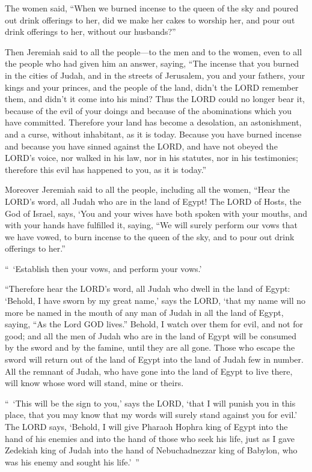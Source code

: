 \myverse{}The women said, “When we burned incense to the queen of the sky and poured out drink offerings to her, did we make her cakes to worship her, and pour out drink offerings to her, without our husbands?”


\myverse{}Then Jeremiah said to all the people—to the men and to the women, even to all the people who had given him an answer, saying, \myverse{}“The incense that you burned in the cities of Judah, and in the streets of Jerusalem, you and your fathers, your kings and your princes, and the people of the land, didn’t the LORD remember them, and didn’t it come into his mind? \myverse{}Thus the LORD could no longer bear it, because of the evil of your doings and because of the abominations which you have committed. Therefore your land has become a desolation, an astonishment, and a curse, without inhabitant, as it is today. \myverse{}Because you have burned incense and because you have sinned against the LORD, and have not obeyed the LORD’s voice, nor walked in his law, nor in his statutes, nor in his testimonies; therefore this evil has happened to you, as it is today.”


\myverse{}Moreover Jeremiah said to all the people, including all the women, “Hear the LORD’s word, all Judah who are in the land of Egypt! \myverse{}The LORD of Hosts, the God of Israel, says, ‘You and your wives have both spoken with your mouths, and with your hands have fulfilled it, saying, “We will surely perform our vows that we have vowed, to burn incense to the queen of the sky, and to pour out drink offerings to her.”

“ ‘Establish then your vows, and perform your vows.’


\myverse{}“Therefore hear the LORD’s word, all Judah who dwell in the land of Egypt: ‘Behold, I have sworn by my great name,’ says the LORD, ‘that my name will no more be named in the mouth of any man of Judah in all the land of Egypt, saying, “As the Lord GOD lives.” \myverse{}Behold, I watch over them for evil, and not for good; and all the men of Judah who are in the land of Egypt will be consumed by the sword and by the famine, until they are all
gone. \myverse{}Those who escape the sword will return out of the land of Egypt into the land of Judah few in number. All the remnant of Judah, who have gone into the land of Egypt to live there, will know whose word will stand, mine or theirs.


\myverse{}“ ‘This will be the sign to you,’ says the LORD, ‘that I will punish you in this place, that you may know that my words will surely stand against you for evil.’ \myverse{}The LORD says, ‘Behold, I will give Pharaoh Hophra king of Egypt into the hand of his enemies and into the hand of those who seek his life, just as I gave Zedekiah king of Judah into the hand of Nebuchadnezzar king of Babylon, who was his enemy and sought his life.’ ”


